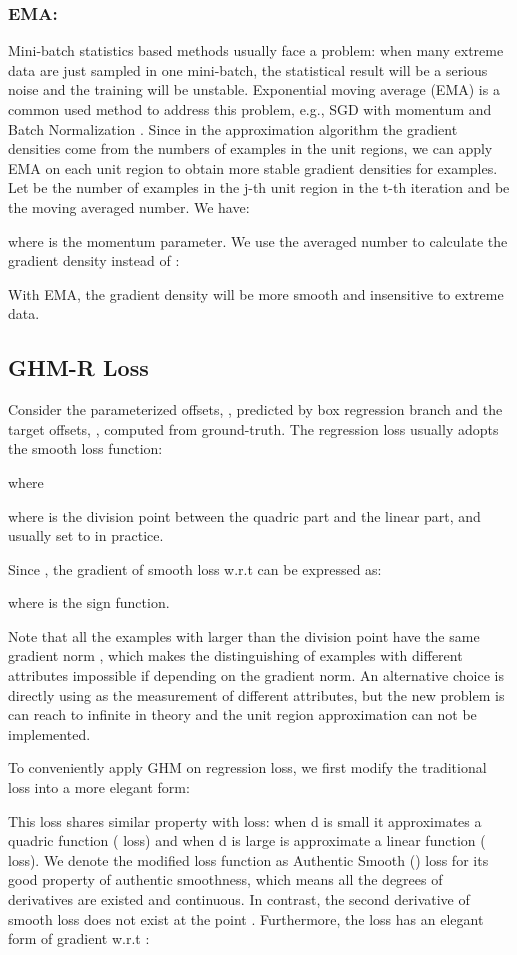 \documentclass[letterpaper]{article} \usepackage{aaai19}  \usepackage{times}  \usepackage{helvet}  \usepackage{courier}  \usepackage{url}  \usepackage{graphicx}  \usepackage{amsmath,amssymb}
\begin{document}
\subsubsection{EMA:} Mini-batch statistics based methods usually face a problem: when many extreme data are just sampled in one mini-batch, the statistical result will be a serious noise and the training will be unstable. Exponential moving average (EMA) is a common used method to address this problem, e.g., SGD with momentum \cite{sgd} and Batch Normalization \cite{bn}. Since in the approximation algorithm the gradient densities come from the numbers of examples in the unit regions, we can apply EMA on each unit region to obtain more stable gradient densities for examples. Let  be the number of examples in the j-th unit region in the t-th iteration and  be the moving averaged number. We have:

where  is the momentum parameter. We use the averaged number  to calculate the gradient density instead of :

With EMA, the gradient density will be more smooth and insensitive to extreme data.


\subsection{GHM-R Loss}
Consider the parameterized offsets, , predicted by box regression branch and the target offsets, , computed from ground-truth. The regression loss usually adopts the smooth  loss function:

where

where  is the division point between the quadric part and the linear part, and usually set to  in practice. 

Since , the gradient of smooth  loss w.r.t  can be expressed as:

where  is the sign function. 

Note that all the examples with  larger than the division point have the same gradient norm , which makes the distinguishing of examples with different attributes impossible if depending on the gradient norm. An alternative choice is directly using  as the measurement of different attributes, but the new problem is  can reach to infinite in theory and the unit region approximation can not be implemented.

To conveniently apply  GHM on regression loss, we first modify the traditional  loss into a more elegant form:

This loss shares similar property with  loss: when d is small it approximates a quadric function ( loss) and when d is large is approximate a linear function ( loss). We denote the modified loss function as Authentic Smooth  () loss for its good property of authentic smoothness, which means all the degrees of derivatives are existed and continuous. In contrast, the second derivative of smooth  loss does not exist at the point . Furthermore, the  loss has an elegant form of gradient w.r.t :
\end{document}
